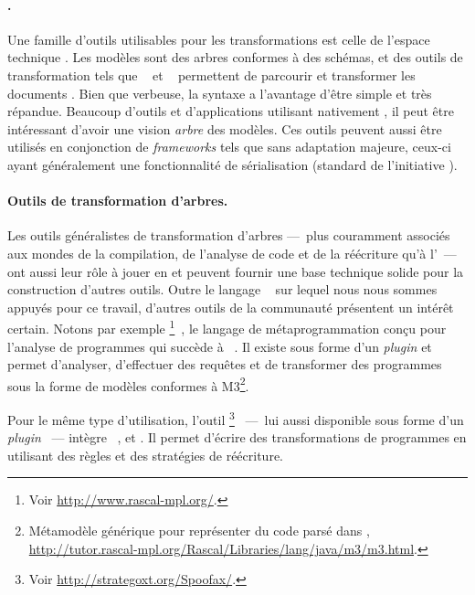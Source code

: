 \paragraph{\xml.} Une famille d'outils utilisables pour les transformations est
celle de l'espace technique {\xml}. Les modèles sont des arbres conformes à des
schémas, et des outils de transformation tels que {\xslt}~\cite{xslt} et
{\xqueryuf}~\cite{xqueryuf} permettent de parcourir et transformer les
documents {\xml}. Bien que verbeuse, la syntaxe {\xml} a l'avantage d'être
simple et très répandue. Beaucoup d'outils et d'applications utilisant
nativement {\xml}, il peut être intéressant d'avoir une vision \emph{arbre
\xml} des modèles. Ces outils peuvent aussi être utilisés en conjonction de
\emph{frameworks} tels que {\emf} sans adaptation majeure, ceux-ci ayant
généralement une fonctionnalité de sérialisation {\xml} (standard {\xmi} de
l'initiative {\mda}).

\paragraph{Outils de transformation d'arbres.} 
Les outils généralistes de transformation d'arbres ---~plus couramment associés
aux mondes de la compilation, de l'analyse de code et de la réécriture qu'à
l'{\idm}~--- ont aussi leur rôle à jouer en {\idm} et peuvent fournir une base
technique solide pour la construction d'autres outils. Outre le langage
{\tom}~\cite{Moreau2003,Balland2007,TomManual-2.10} sur lequel nous nous sommes
appuyés pour ce travail, d'autres outils de la communauté présentent un intérêt
certain. Notons par exemple
{\rascal}\footnote{Voir \url{http://www.rascal-mpl.org/}.}~\cite{Klint2011,Klint2011a},
le langage de métaprogrammation conçu pour l'analyse de programmes qui succède
à {\asfsdf}~\cite{Brand2001}. Il existe sous forme d'un \emph{plugin}
{\eclipse} et permet d'analyser, d'effectuer des requêtes et de transformer des
programmes sous la forme de modèles conformes à M3\footnote{Métamodèle
  générique pour représenter du code parsé dans {\rascal},
  \url{http://tutor.rascal-mpl.org/Rascal/Libraries/lang/java/m3/m3.html}.}.

Pour le même type d'utilisation, l'outil
{\spoofax}\footnote{Voir \url{http://strategoxt.org/Spoofax/}.}~\cite{Kats2010}
---~lui aussi disponible sous forme d'un \emph{plugin} {\eclipse}~--- intègre
{\stratego}~\cite{Visser1998},\cite{Visser01} et {\sdf}. Il permet d'écrire des
transformations de programmes en utilisant des règles et des stratégies de
réécriture.

